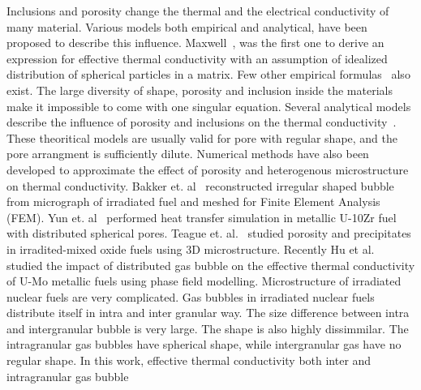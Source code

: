 \begin{doublespacing}
Inclusions and porosity change the thermal and the electrical conductivity of many material. Various models both empirical and analytical, have been proposed to describe this influence. Maxwell~\cite{maxwell1881treatise}, was the first one to derive an expression for effective thermal conductivity with an assumption of idealized distribution of spherical particles in a matrix. Few other empirical formulas~\cite{macewan1967effect,goldsmith1973measurements,devries1989experimental} also exist. The large diversity of shape, porosity and inclusion inside the materials make it impossible to come with one singular equation. Several analytical models describe the influence of porosity and inclusions on the thermal conductivity~\cite{maxwell1881treatise,loeb1954thermal, cunningham1981heat, tzou1991effect, bauer1993general}. These theoritical models are usually valid for pore with regular shape, and the pore arrangment is sufficiently dilute. Numerical methods have also been developed to approximate the effect of porosity and heterogenous microstructure on thermal conductivity. Bakker et. al~\cite{bakker1995determination, bakker1997using} reconstructed irregular shaped bubble from micrograph of irradiated fuel and meshed for Finite Element Analysis (FEM). Yun et. al~\cite{yun2014simulation} performed heat transfer simulation in metallic U-10Zr fuel with distributed spherical pores. Teague et. al.~\cite{teague2014using} studied porosity and precipitates in irradited-mixed oxide fuels using 3D microstructure. Recently Hu et al.~\cite{hu2015assessment} studied the impact of distributed gas bubble on the effective thermal conductivity of U-Mo metallic fuels using phase field modelling. Microstructure of irradiated nuclear fuels are very complicated. Gas bubbles in irradiated nuclear fuels distribute itself in intra and inter granular way. The size difference between intra and intergranular bubble is very large. The shape is also highly dissimmilar. The intragranular gas bubbles have spherical shape, while intergranular gas have no regular shape. In this work, effective thermal conductivity  both inter and intragranular gas bubble 





\end{doublespacing}



